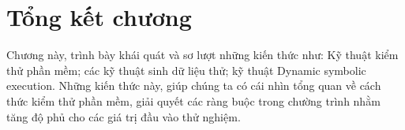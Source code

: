 \section*{Tổng kết chương}
Chương này, trình bày khái quát và sơ lượt những kiến thức như: Kỹ thuật kiểm thử phần mềm; các kỹ thuật sinh dữ liệu thử; kỹ thuật Dynamic symbolic execution. Những kiến thức này, giúp chúng ta có cái nhìn tổng quan về cách thức kiểm thử phần mềm, giải quyết các ràng buộc trong chường trình nhằm tăng độ phủ cho các giá trị đầu vào thử nghiệm.


